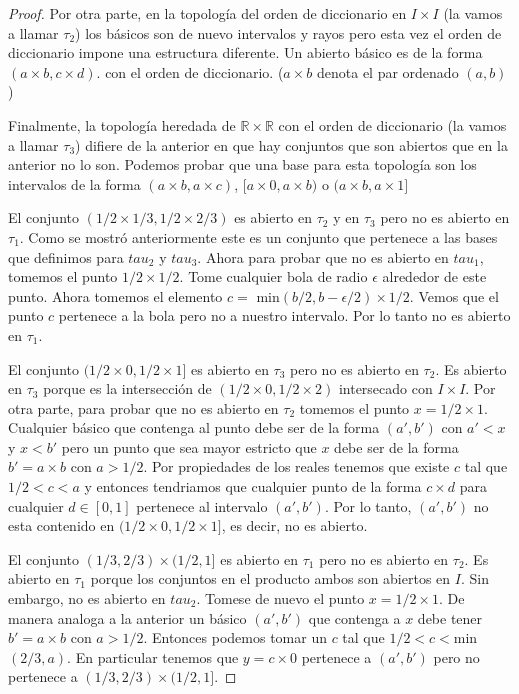 \documentclass[letter,twoside,11pt]{article}
\begin{document}
\begin{enumerate}
\begin{proof}
Por otra parte, en la topolog\'ia del orden de diccionario en $I \times I$ (la vamos a llamar $\tau_2$) los b\'asicos son de nuevo intervalos y rayos pero esta vez el orden de diccionario impone una estructura diferente. Un abierto b\'asico es de la forma $(a \times b, c \times d)$. con el orden de diccionario. ($a \times b$ denota el par ordenado $(a,b)$)

Finalmente, la topolog\'ia heredada de $\mathbb{R} \times \mathbb{R}$ con el orden de diccionario (la vamos a llamar $\tau_3$) difiere de la anterior en que hay conjuntos que son abiertos que en la anterior no lo son. Podemos probar que una base para esta topolog\'ia son los intervalos de la forma $(a \times b, a \times c)$, $[a \times 0, a \times b)$ o $(a \times b, a \times 1]$

El conjunto $(1/2 \times 1/3 , 1/2 \times 2/3)$ es abierto en $\tau_2$ y en $\tau_3$ pero no es abierto en $\tau_1$. Como se mostr\'o anteriormente este es un conjunto que pertenece a las bases que definimos para $tau_2$ y $tau_3$. Ahora para probar que no es abierto en $tau_1$, tomemos el punto $1/2 \times 1/2$. Tome cualquier bola de radio $\epsilon$ alrededor de este punto. Ahora tomemos el elemento $c=$ min$(b/2,b-\epsilon/2)\times 1/2$. Vemos que el punto $c$ pertenece a la bola pero no a nuestro intervalo. Por lo tanto no es abierto en $\tau_1$.

El conjunto $(1/2 \times 0 , 1/2 \times 1]$ es abierto en $\tau_3$ pero no es abierto en $\tau_2$. Es abierto en $\tau_3$ porque es la intersecci\'on de $(1/2 \times 0 , 1/2 \times 2)$ intersecado con $I \times I$. Por otra parte, para probar que no es abierto en $\tau_2$ tomemos el punto $x=1/2 \times 1$. Cualquier b\'asico que contenga al punto debe ser de la forma $(a',b')$ con $a'<x$ y $x<b'$ pero un punto que sea mayor estricto que $x$ debe ser de la forma $b'=a \times b$ con $a > 1/2$. Por propiedades de los reales tenemos que existe $c$ tal que $1/2<c<a$ y entonces tendriamos que cualquier punto de la forma $c \times d$ para cualquier $d \in [0,1]$ pertenece al intervalo $(a',b')$. Por lo tanto, $(a',b')$ no esta contenido en $(1/2 \times 0 , 1/2 \times 1]$, es decir, no es abierto.   

El conjunto $(1/3,2/3)\times(1/2,1]$ es abierto en $\tau_1$ pero no es abierto en $\tau_2$. Es abierto en $\tau_1$ porque los conjuntos en el producto ambos son abiertos en $I$. Sin embargo, no es abierto en $tau_2$. Tomese de nuevo el punto $x=1/2 \times 1$. De manera analoga a la anterior un b\'asico $(a',b')$ que contenga a $x$ debe tener $b'= a \times b$ con $a>1/2$. Entonces podemos tomar un $c$ tal que $1/2<c<$min$(
2/3,a)$. En particular tenemos que $y=c \times 0$ pertenece a $(a',b')$ pero no pertenece a $(1/3,2/3)\times(1/2,1]$.   


\end{proof}
\end{enumerate}
\end{document}
